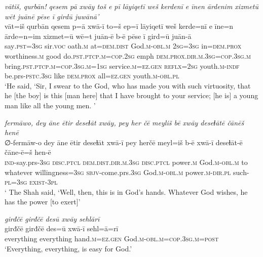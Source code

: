 \ea \label{ZQ.54}
\textit{vātiš, qurbān! qesem pā xwāy toš e pī lāyiqetī weš kerdenī e īnen ārdenim xizmetū wēt juānē pēse ī girdū juwānā’} \\ 
\gll vāt=iš qurbān qesem p=ā xwā-ī to=š ep=ī lāyiqetī weš kerde=nī e īne=n ārde=n=im xizmet=ū wē=t juān-ē b-ē pēse ī gird=ū juān-ā \\ 
 say\textsc{.pst}\textsc{=3sg} sir.\textsc{voc} oath\textsc{.m} at=\textsc{dem.dist} God\textsc{.m}\textsc{-obl}\textsc{.m} \textsc{2sg}\textsc{=3sg} in=\textsc{dem.prox} worthiness\textsc{.m} good do\textsc{.pst}\textsc{.ptcp}\textsc{.m}\textsc{=cop}\textsc{.\textsc{2sg}} emph \textsc{dem.prox}\textsc{.dir}\textsc{.m}\textsc{.3sg}\textsc{=cop}\textsc{.3sg}\textsc{.m} bring\textsc{.pst}\textsc{.ptcp}\textsc{.m}\textsc{=cop}\textsc{.3sg}\textsc{.m}\textsc{=\textsc{1sg}} service\textsc{.m}\textsc{=ez.gen} \textsc{reflx}\textsc{=\textsc{2sg}} youth\textsc{.m}\textsc{-indf} be.prs\textsc{-pstc}\textsc{.3sg} like \textsc{dem.prox} all\textsc{=ez.gen} youth\textsc{.m}\textsc{-obl}\textsc{.pl} \\ 
\glt `He said, ‘Sir, I swear to the God, who has made you with such virtuosity, that he [the boy] is this [man here] that I have brought to your service; [he is] a young man like all the young men. '
\z 
 
\ea \label{ZQ.55}
\textit{fermāwo, dey āne ētir deseɫāt xwāy, pey her čē meyliš bē xwāy deseɫātē čānēš henē} \\ 
\gll ∅-fermāw-o dey āne ētir deseɫāt xwā-ī pey herčē meyl=iš b-ē xwā-ī deseɫāt-ē čāne-ē=š hen-ē \\ 
 \textsc{ind-}say.prs\textsc{-3sg} \textsc{disc.ptcl} \textsc{dem.dist}\textsc{.dir}\textsc{.m}\textsc{.3sg} \textsc{disc.ptcl} power\textsc{.m} God\textsc{.m}\textsc{-obl}\textsc{.m} to whatever willingness\textsc{=3sg} \textsc{sbjv-}come.prs\textsc{.3sg} God\textsc{.m}\textsc{-obl}\textsc{.m} power\textsc{.m-dir.pl} such\textsc{-pl}\textsc{=3sg} \textsc{exist}\textsc{-3pl} \\ 
\glt ` The Shah said, ‘Well, then, this is in God’s hands. Whatever God wishes, he has the power [to exert]'
\z 
 
\ea \label{ZQ.56}
\textit{girđčē girđčē desū xwāy sehlārī} \\ 
\gll girđčē girđčē des=ū xwā-ī sehl=ā=rī \\ 
 everything everything hand\textsc{.m}\textsc{=ez.gen} God\textsc{.m}\textsc{-obl}\textsc{.m}\textsc{=cop}\textsc{.3sg}\textsc{.m}\textsc{=\textsc{post}} \\ 
\glt `Everything, everything, is easy for God.'
\z 
 

